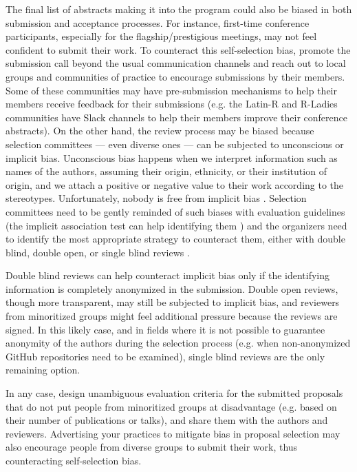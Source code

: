 \documentclass[10pt,letterpaper]{article}
\begin{document}

The final list of abstracts making it into the program could also be biased in both submission and acceptance processes. 
For instance, first-time conference participants, especially for the flagship/prestigious meetings, may not feel confident to submit their work.
 To counteract this self-selection bias, promote the submission call beyond the usual communication channels and reach out to local groups and communities of practice to encourage submissions by their members.
Some of these communities may have pre-submission mechanisms to help their members receive feedback for their submissions (e.g. the Latin-R and R-Ladies communities have Slack channels to help their members improve their conference abstracts).
On the other hand, the review process may be biased because selection committees — even diverse ones — can be subjected to unconscious or implicit bias.
Unconscious bias happens when we interpret information such as names of the authors, assuming their origin, ethnicity, or their institution of origin, and we attach a positive or negative value to their work according to the stereotypes. Unfortunately, nobody is free from implicit bias \cite{ross_everyday_2020}.
Selection committees need to be gently reminded of such biases with evaluation guidelines (the implicit association test can help identifying them \cite{greenwald_measuring_nodate}) and the organizers need to
identify the most appropriate strategy to counteract them, either with double blind, double open, or single blind reviews \cite{numfocus_discover_2021}.

Double blind reviews can help counteract implicit bias only if the identifying information is completely anonymized in the submission. 
Double open reviews, though more transparent, may still be subjected to implicit bias, and reviewers from minoritized groups might feel additional pressure because the reviews are signed. In this likely case, and in fields where it is not possible to guarantee anonymity of the authors during the selection process (e.g. when non-anonymized GitHub repositories need to be examined), single blind reviews are the only remaining option.  

In any case, design unambiguous evaluation criteria for the submitted proposals that do not put people from minoritized groups at disadvantage (e.g. based on their number of publications or talks), and share them with the authors and reviewers.
Advertising your practices to mitigate bias in proposal selection may also encourage people from diverse groups to submit their work, thus counteracting self-selection bias.
\end{document}
